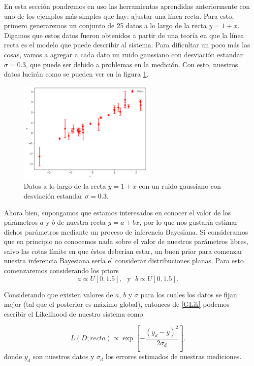 \documentclass[10.5pt,prb,
               showpacs,            %
               preprintnumbers,     %
               aps,                 %
               prl,          	    %
               letterpaper,             %
               superscriptaddress,      %
               nofootinbib,         %
               tightenlines,        %
               floats,floatfix      %
               ,usenatbib]{revtex4-1}%
\begin{document}
En esta secci\'on pondremos en uso las herramientas aprendidas anteriormente con uno de los 
ejemplos m\'as simples que hay: ajustar una l\'inea recta. Para esto, primero generaremos un 
conjunto de 25 datos a lo largo de la recta $y=1+x$. Digamos que estos datos fueron obtenidos 
a partir de una teor\'ia en que la l\'inea recta es el modelo que puede describir al sistema. 
Para dificultar un poco m\'as las cosas, vamos a agregar a cada dato un ruido gaussiano con 
desviaci\'on estandar $\sigma = 0.3$, que puede ser debido a problemas en la medici\'on. 
Con esto, nuestros datos lucir\'an como se pueden ver en la figura \ref{dat}.


\begin{figure}[ht] 
\includegraphics[trim = 1mm  1mm 1mm 1mm, clip, width=8.cm, height=5cm]{data.png}
\caption{Datos a lo largo 
de la recta $y=1+x$ con un ruido gaussiano con desviaci\'on estandar $\sigma = 0.3$.}%
\label{dat}
\end{figure}


Ahora bien, supongamos que estamos interesados en conocer el valor de los par\'ametros 
$a$ y $b$ de nuestra recta $y=a+bx$, por lo que nos gustar\'ia estimar dichos par\'ametros 
mediante un proceso de inferencia Bayesiana. Si consideramos que en principio no conocemos nada sobre el valor de 
nuestros par\'ametros libres, salvo las cotas l\'imite en que \'estos deber\'ian estar, un buen prior para 
comenzar nuestra inferencia Bayesiana ser\'ia el considerar distribuciones planas. Para esto comenzaremos considerando los priors
%
	\begin{equation}
		a \propto U[0,1.5], \ \ \ \text{y} \ \ \ b \propto U[0,1.5].
	\end{equation}

Considerando que existen valores de $a$, $b$ y $\sigma$ para los cuales los datos se fijan mejor 
(tal que el posterior es m\'aximo global), entonces de \eqref{GLik} podemos escribir el Likelihood de nuestro sistema como 

	\begin{equation}
		L(D;recta)\propto \exp\left[-\frac{(y_d-y)^2}{2\sigma_d}\right].
	\end{equation}
donde $y_d$ son nuestros datos y $\sigma_d$ los errores estimados de nuestras mediciones.
\end{document}
